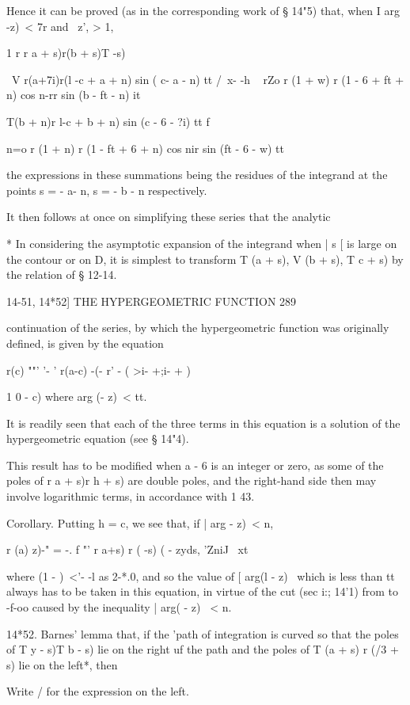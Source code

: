 Hence it can be proved (as in the corresponding work of § 14"5) that,
when I arg -z)\ < 7r and \ z', > 1,

1 r r a + s)r(b + s)T -s)

\ V r(a+7i)r(l -c + a + n) sin ( c- a - n) tt /\ x- -h ~ rZo r (1 + w)
r (1 - 6 + ft + n) cos n-rr sin (b - ft - n) it

  T(b + n)r l-c + b + n) sin (c - 6 - ?i) tt f \

n=o r (1 + n) r (1 - ft + 6 + n) cos nir sin (ft - 6 - w) tt

the expressions in these summations being the residues of the
integrand at the points s = - a- n, s = - b - n respectively.

It then follows at once on simplifying these series that the analytic

* In considering the asymptotic expansion of the integrand when | s [
is large on the contour or on D, it is simplest to transform T (a +
s), V (b + s), T c + s) by the relation of § 12-14.

14-51, 14*52] THE HYPERGEOMETRIC FUNCTION 289

continuation of the series, by which the hypergeometric function was
originally defined, is given by the equation

r(c) ""' '- ' r(a-c) -(- r' - ( >i- +;i- + )

1 0 - c) where arg (- z)\ < tt.

It is readily seen that each of the three terms in this equation is a
solution of the hypergeometric equation (see § 14"4).

This result has to be modified when a - 6 is an integer or zero, as
some of the poles of r a + s)r h + s) are double poles, and the
right-hand side then may involve logarithmic terms, in accordance with
1 43.

Corollary. Putting h = c, we see that, if | arg - z)\ < n,

r (a) z)-" = -. f "' r a+s) r ( -s) ( - zyds, 'ZniJ \ xt

where (1 - )~<'- -l as 2-*.0, and so the value of [ arg(l - z) \ which
is less than tt always has to be taken in this equation, in virtue of
the cut (sec i:; 14'1) from to -f-oo caused by the inequality | arg( -
z) \ < n.

14*52. Barnes' lemma that, if the 'path of integration is curved so
that the poles of T y - s)T b - s) lie on the right uf the path and
the poles of T (a + s) r (/3 + s) lie on the left*, then

Write / for the expression on the left.

